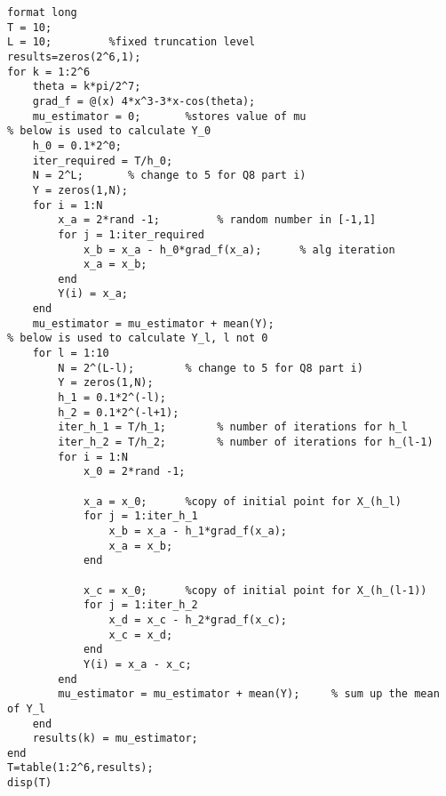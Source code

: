 \lstset{basicstyle=\footnotesize,style=myCustomMatlabStyle}
\begin{lstlisting}
format long
T = 10;
L = 10;         %fixed truncation level
results=zeros(2^6,1);       
for k = 1:2^6
    theta = k*pi/2^7;
    grad_f = @(x) 4*x^3-3*x-cos(theta); 
    mu_estimator = 0;       %stores value of mu
% below is used to calculate Y_0    
    h_0 = 0.1*2^0;
    iter_required = T/h_0;
    N = 2^L;       % change to 5 for Q8 part i)
    Y = zeros(1,N);
    for i = 1:N
        x_a = 2*rand -1;         % random number in [-1,1]
        for j = 1:iter_required
            x_b = x_a - h_0*grad_f(x_a);      % alg iteration
            x_a = x_b;
        end
        Y(i) = x_a;
    end
    mu_estimator = mu_estimator + mean(Y);
% below is used to calculate Y_l, l not 0
    for l = 1:10
        N = 2^(L-l);        % change to 5 for Q8 part i)
        Y = zeros(1,N);        
        h_1 = 0.1*2^(-l);
        h_2 = 0.1*2^(-l+1);
        iter_h_1 = T/h_1;        % number of iterations for h_l
        iter_h_2 = T/h_2;        % number of iterations for h_(l-1)
        for i = 1:N
            x_0 = 2*rand -1;         
         
            x_a = x_0;      %copy of initial point for X_(h_l)
            for j = 1:iter_h_1
                x_b = x_a - h_1*grad_f(x_a);      
                x_a = x_b;
            end
         
            x_c = x_0;      %copy of initial point for X_(h_(l-1))
            for j = 1:iter_h_2
                x_d = x_c - h_2*grad_f(x_c);      
                x_c = x_d;
            end
            Y(i) = x_a - x_c;
        end
        mu_estimator = mu_estimator + mean(Y);     % sum up the mean of Y_l
    end
    results(k) = mu_estimator;
end
T=table(1:2^6,results);
disp(T)
\end{lstlisting}